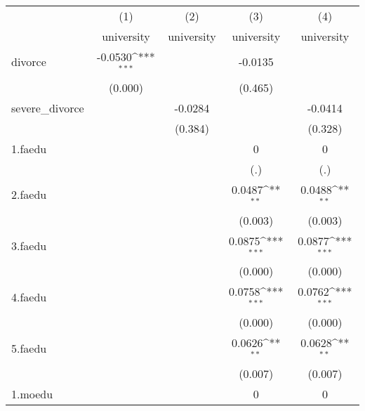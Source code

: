 {
\def\sym#1{\ifmmode^{#1}\else\(^{#1}\)\fi}
\begin{tabular}{l*{4}{c}}
\hline\hline
            &\multicolumn{1}{c}{(1)}&\multicolumn{1}{c}{(2)}&\multicolumn{1}{c}{(3)}&\multicolumn{1}{c}{(4)}\\
            &\multicolumn{1}{c}{university}&\multicolumn{1}{c}{university}&\multicolumn{1}{c}{university}&\multicolumn{1}{c}{university}\\
\hline
divorce     &     -0.0530\sym{***}&                     &     -0.0135         &                     \\
            &     (0.000)         &                     &     (0.465)         &                     \\
[1em]
severe\_divorce&                     &     -0.0284         &                     &     -0.0414         \\
            &                     &     (0.384)         &                     &     (0.328)         \\
[1em]
1.faedu     &                     &                     &           0         &           0         \\
            &                     &                     &         (.)         &         (.)         \\
[1em]
2.faedu     &                     &                     &      0.0487\sym{**} &      0.0488\sym{**} \\
            &                     &                     &     (0.003)         &     (0.003)         \\
[1em]
3.faedu     &                     &                     &      0.0875\sym{***}&      0.0877\sym{***}\\
            &                     &                     &     (0.000)         &     (0.000)         \\
[1em]
4.faedu     &                     &                     &      0.0758\sym{***}&      0.0762\sym{***}\\
            &                     &                     &     (0.000)         &     (0.000)         \\
[1em]
5.faedu     &                     &                     &      0.0626\sym{**} &      0.0628\sym{**} \\
            &                     &                     &     (0.007)         &     (0.007)         \\
[1em]
1.moedu     &                     &                     &           0         &           0         \\

\end{tabular}}
